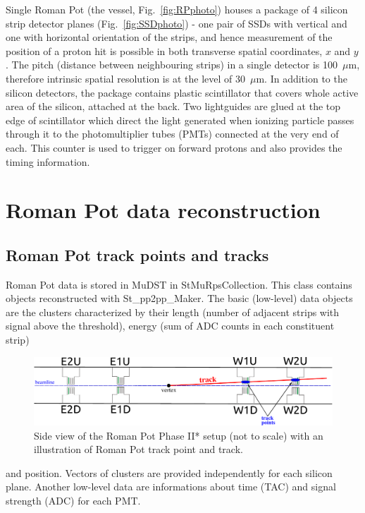 Single Roman Pot (the vessel, Fig.~\ref{fig:RPphoto}) houses a package of 4 silicon strip detector planes (Fig.~\ref{fig:SSDphoto}) - one pair of SSDs with vertical and one with horizontal orientation of the strips, and hence measurement of the position of a proton hit is possible in both transverse spatial coordinates, $x$ and $y$. The pitch (distance between neighbouring strips) in a single detector is 100~$\mu$m, therefore intrinsic spatial resolution is at the level of 30~$\mu$m. In addition to the silicon detectors, the package contains plastic scintillator that covers whole active area of the silicon, attached at the back. Two lightguides are glued at the top edge of scintillator which direct the light generated when ionizing particle passes through it to the photomultiplier tubes (PMTs) connected at the very end of each. This counter is used to trigger on forward protons and also provides the timing information.

\section{Roman Pot data reconstruction}

\subsection{Roman Pot track points and tracks}

Roman Pot data is stored in MuDST in StMuRpsCollection. This class contains objects reconstructed with St\_pp2pp\_Maker. The basic (low-level) data objects are the clusters characterized by their length (number of adjacent strips with signal above the threshold), energy (sum of ADC counts in each constituent strip) %
\begin{figure}[hb]%
\centering\includegraphics[width=\linewidth]{graphics/rpSim/trackDefinition.pdf}%
\caption[Side view of the Roman Pot Phase II* setup with an illustration of Roman Pot track point and track.]{Side view of the Roman Pot Phase II* setup (not to scale) with an illustration of Roman Pot track point and track.}\label{fig:RpTrackDefinition}%
\end{figure}%
and position. Vectors of clusters are provided independently for each silicon plane. Another low-level data are informations about time (TAC) and signal strength (ADC) for each PMT.

